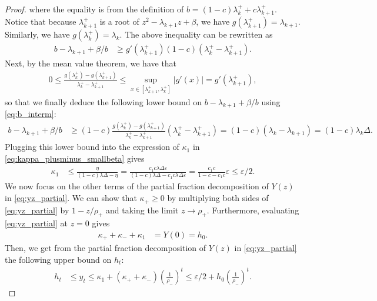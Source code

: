 \documentclass{article}
\theoremstyle{plain}
\theoremstyle{definition}
\theoremstyle{remark}
\begin{document}
\begin{proof}
  where the equality is from the definition of $b = (1-c)\lambda_k^+ + c \lambda_{k+1}^+$. Notice that because $\lambda_{k+1}^+$ is a root of $z^2 - \lambda_{k+1} z + \beta$, we have $g(\lambda_{k+1}^+) = \lambda_{k+1}$. Similarly, we have $g(\lambda_k^+) = \lambda_k$. The above inequality can be rewritten as
  \begin{align}\label{eq:b_interm}
    b - \lambda_{k+1} + \beta / b & \geqslant g'(\lambda_{k+1}^+)(1-c) (\lambda_k^+ - \lambda_{k+1}^+).
  \end{align}
  Next, by the mean value theorem, we have that
  \begin{align*}
    0 \leqslant \frac{g(\lambda_k^+) - g(\lambda_{k+1}^+)}{\lambda_k^+ - \lambda_{k+1}^+} \leqslant \sup_{x \in [\lambda_{k+1}^+, \lambda_k^+]} \vert g'(x)\vert = g'(\lambda_{k+1}^+),
  \end{align*}
  so that we finally deduce the following lower bound on $b - \lambda_{k+1} + \beta / b$ using \eqref{eq:b_interm}:
  \begin{align*}
    b - \lambda_{k+1} + \beta / b & \geqslant (1-c) \frac{g(\lambda_k^+) - g(\lambda_{k+1}^+)}{\lambda_k^+ - \lambda_{k+1}^+} (\lambda_k^+ - \lambda_{k+1}^+) = (1-c)(\lambda_k - \lambda_{k+1}) = (1-c)\lambda_k\Delta.
  \end{align*}
  Plugging this lower bound into the expression of $\kappa_1$ in \eqref{eq:kappa_plusminus_smallbeta} gives
  \begin{align*}
    \kappa_1 & \leqslant \frac{\eta}{(1-c)\lambda\Delta - \eta} = \frac{c_1 c \lambda \Delta \varepsilon}{(1-c)\lambda\Delta - c_1c \lambda \Delta \varepsilon} = \frac{c_1 c}{1-c - c_1 c} \varepsilon \leqslant \varepsilon/2.
  \end{align*}
  We now focus on the other terms of the partial fraction decomposition of $Y(z)$ in \eqref{eq:yz_partial}. We can show that $\kappa_+ \geqslant 0$ by multiplying both sides of \eqref{eq:yz_partial} by $1 - z/\rho_+$ and taking the limit $z \to \rho_+$. Furthermore, evaluating \eqref{eq:yz_partial} at $z=0$ gives
  \begin{align*}
    \kappa_+ + \kappa_-  + \kappa _1 & = Y(0) = h_0.
  \end{align*}
  Then, we get from the partial fraction decomposition of $Y(z)$ in \eqref{eq:yz_partial} the following upper bound on $h_t$:
  \begin{align}\label{eq:ht_geometric_decay}
    h_t & \leqslant y_t \leqslant \kappa_1 + (\kappa_+ + \kappa_-) \left(\frac{1}{\rho_-}\right)^t \leqslant \varepsilon/2 + h_0 \left(\frac{1}{\rho_-}\right)^t.

\end{align}
\end{proof}
\end{document}
